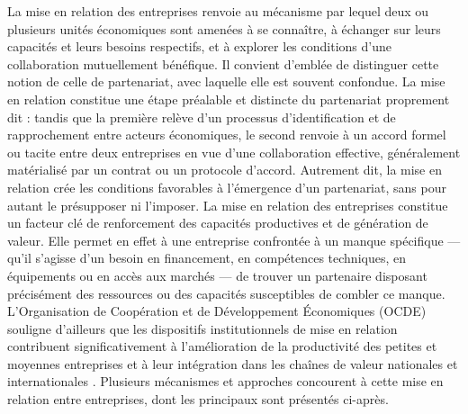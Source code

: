 \documentclass[12pt, a4paper, oneside]{report}
\begin{document}
La mise en relation des entreprises renvoie au mécanisme par lequel deux ou plusieurs unités économiques sont amenées à se connaître, à échanger sur leurs capacités et leurs besoins respectifs, et à explorer les conditions d'une collaboration mutuellement bénéfique. Il convient d'emblée de distinguer cette notion de celle de partenariat, avec laquelle elle est souvent confondue. La mise en relation constitue une étape préalable et distincte du partenariat proprement dit : tandis que la première relève d'un processus d'identification et de rapprochement entre acteurs économiques, le second renvoie à un accord formel ou tacite entre deux entreprises en vue d'une collaboration effective, généralement matérialisé par un contrat ou un protocole d'accord. Autrement dit, la mise en relation crée les conditions favorables à l'émergence d'un partenariat, sans pour autant le présupposer ni l'imposer. 
La mise en relation des entreprises constitue un facteur clé de renforcement des capacités productives et de génération de valeur. Elle permet en effet à une entreprise confrontée à un manque spécifique — qu'il s'agisse d'un besoin en financement, en compétences techniques, en équipements ou en accès aux marchés — de trouver un partenaire disposant précisément des ressources ou des capacités susceptibles de combler ce manque. L'Organisation de Coopération et de Développement Économiques (OCDE) souligne d'ailleurs que les dispositifs institutionnels de mise en relation contribuent significativement à l'amélioration de la productivité des petites et moyennes entreprises et à leur intégration dans les chaînes de valeur nationales et internationales \cite{ocde2021}. Plusieurs mécanismes et approches concourent à cette mise en relation entre entreprises, dont les principaux sont présentés ci-après.
	
\end{document}
